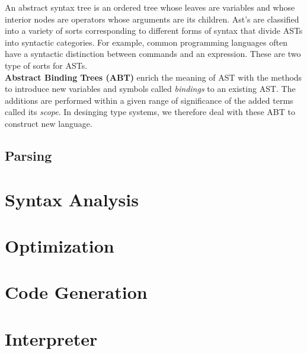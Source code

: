 An abstract syntax tree is an ordered tree whose leaves are variables and whose interior nodes are operators whose arguments are its children. Ast’s are classified into a variety of sorts corresponding to different forms of syntax that divide ASTs into syntactic categories. For example, common programming languages often have a syntactic distinction between commands and an expression. These are two type of sorts for ASTs.\\

\textbf{Abstract Binding Trees (ABT)} enrich the meaning of AST with the methods to introduce new variables and symbols called \textit{bindings} to an existing AST. The additions are performed within a given range of significance of the added terms called its \textit{scope}. In desinging type systems, we therefore deal with these ABT to construct new language.\\ 

\subsection{Parsing}



\section{Syntax Analysis}
\section{Optimization}
\section{Code Generation}

\section{Interpreter}
